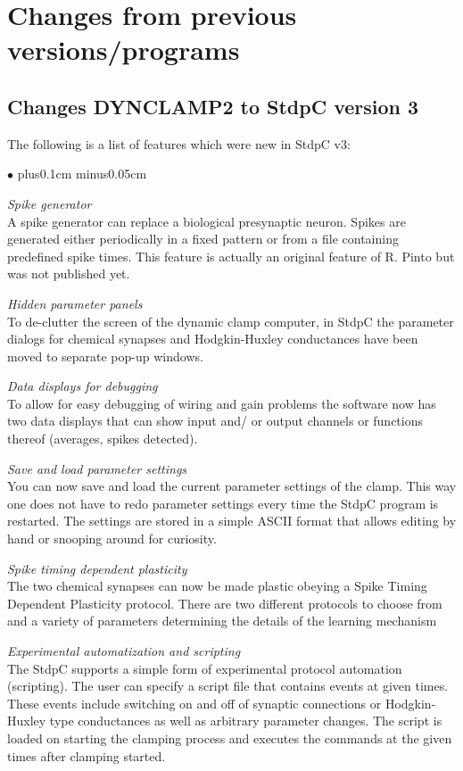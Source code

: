 \documentclass{article}
\newenvironment{myitem}{\begin{list}{$\bullet$}{\setlength{\leftmargin}{1.1em}
\itemsep0.1cm plus0.1cm minus0.05cm
\listparindent0cm
\addtolength{\labelsep}{0.5\labelsep}
\setlength{\labelwidth}{0.8em}
\setlength{\leftmargin}{\labelwidth}
\addtolength{\leftmargin}{\labelsep}
}}{\end{list}}
\begin{document}
\section{Changes from previous versions/programs}
\subsection{Changes DYNCLAMP2 to StdpC version 3}
The following is a list of features which were new in StdpC v3: 
\begin{myitem}
  \item {\em Spike generator} \\
    A spike generator can replace a biological presynaptic neuron. Spikes are
    generated either periodically in a fixed pattern or from a file
    containing predefined spike times. This feature is actually an original
    feature of R. Pinto but was not published yet.
  \item {\em Hidden parameter panels} \\
    To de-clutter the screen of the dynamic clamp computer, in StdpC the
    parameter dialogs for chemical synapses and Hodgkin-Huxley conductances
    have been moved to separate pop-up windows.
  \item {\em Data displays for debugging} \\
    To allow for easy debugging of wiring and gain problems the software now
    has two data displays that can show input and/ or output channels or
    functions thereof (averages, spikes detected).
  \item {\em Save and load parameter settings} \\
    You can now save and load the current parameter settings of the
    clamp. This way one does not have to redo parameter settings every time
    the StdpC program is restarted. The settings are stored in a simple ASCII
    format that allows editing by hand or snooping around for curiosity. 
  \item {\em Spike timing dependent plasticity} \\
    The two chemical synapses can now be made plastic obeying a Spike Timing
    Dependent Plasticity protocol. There are two different protocols to
    choose from and a variety of parameters determining the details of the
    learning mechanism
  \item {\em Experimental automatization and scripting} \\
    The StdpC supports a simple form of experimental protocol automation
    (scripting). The user can specify a script file that contains events at
    given times. These events include switching on and off of synaptic
    connections or Hodgkin-Huxley type conductances as well as arbitrary
    parameter changes. The script is loaded on starting the clamping process
    and executes the commands at the given times after clamping started.
\end{myitem}
\end{document}
